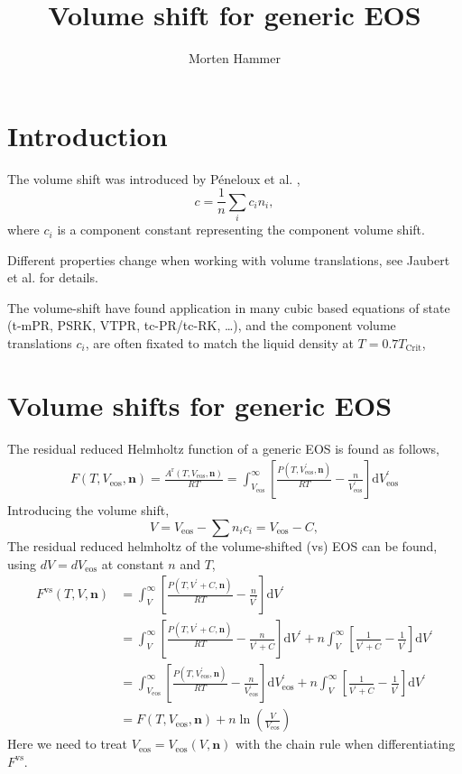 \documentclass[english]{../thermomemo/thermomemo}
\title{Volume shift for generic EOS}
\author{Morten Hammer}
\newcommand*{\vektor}[1]{\boldsymbol{#1}}%
\newcommand{\dd}[1]{\mathrm{d}{#1}}
\begin{document}
\frontmatter


\section{Introduction}
The volume shift was introduced by P{\'e}neloux et al. \cite{Peneloux1982},
\begin{equation}
  c = \frac{1}{n}\underset{i}{\sum}c_i n_i,
\label{eq:volumeshift}
\end{equation}
where $c_i$ is a component constant representing the component volume
shift.

Different properties change when working with volume translations, see
Jaubert et al. \cite{Jaubert2016} for details.

The volume-shift have found application in many cubic based equations
of state (t-mPR\cite{Kordas1995}, PSRK\cite{Fischer1996},
VTPR\cite{Collinet2006}, tc-PR/tc-RK\cite{LeGuennec2016}, \dots), and
the component volume translations $c_i$, are often fixated to match the
liquid density at $T=0.7T_{\text{Crit}}$,
\section{Volume shifts for generic EOS}

The residual reduced Helmholtz function of a  generic EOS is found as follows,
\begin{align}
  F(T,V_{\text{eos}},\vektor{n}) = \frac{A^\text{r}(T,V_{\text{eos}},\vektor{n})}{RT}
  = \int^\infty_{V_{\text{eos}}} \left[ \frac{P(T,V_{\text{eos}}^\prime,\vektor{n})}{RT} - \frac{n}{V_{\text{eos}}^\prime} \right]\dd{V_{\text{eos}}^\prime}
  \label{eq:helmholtz_int_eos}
\end{align}
Introducing the volume shift,
\begin{equation}
V = V_{\text{eos}}- \sum n_ic_i = V_{\text{eos}}- C,
\label{eq:v_shift}
\end{equation}
The residual reduced helmholtz of the volume-shifted (vs) EOS can be
found, using $dV = dV_{\text{eos}}$ at constant $n$ and $T$,
\begin{align}
  F^{\text{vs}}(T,V,\vektor{n})
  &= \int^\infty_V \left[ \frac{P(T,V^\prime+C,\vektor{n})}{RT} - \frac{n}{V^\prime} \right]\dd{V^\prime} \\ &= \int^\infty_V \left[ \frac{P(T,V^\prime+C,\vektor{n})}{RT} - \frac{n}{V^\prime + C} \right]\dd{V^\prime} + n\int^\infty_V \left[\frac{1}{V^\prime + C}  - \frac{1}{V^\prime} \right]\dd{V^\prime}\\ &= \int^\infty_{V_{\text{eos}}} \left[ \frac{P(T,V_{\text{eos}}^\prime,\vektor{n})}{RT} - \frac{n}{V_{\text{eos}}^\prime} \right]\dd{V_{\text{eos}}^\prime} + n\int^\infty_V \left[\frac{1}{V^\prime + C}  - \frac{1}{V^\prime} \right]\dd{V^\prime}\\ &= F(T,V_{\text{eos}},\vektor{n})  + n \ln \left(\frac{V}{V_{\text{eos}}} \right)
  \label{eq:helmholtz_int}
\end{align}
Here we need to treat $V_{\text{eos}} = V_{\text{eos}}(V,\vektor{n})$ with the
chain rule when differentiating $F^{\text{vs}}$.
\end{document}
